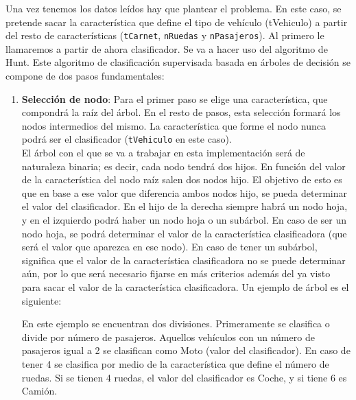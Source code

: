 \documentclass[12pt]{report}\usepackage[]{graphicx}\usepackage[dvipsnames]{xcolor}
\begin{document}
 			Una vez tenemos los datos leídos hay que plantear el problema. En este caso, se pretende sacar la característica que define el tipo de vehículo (tVehiculo) a partir del resto de características (\texttt{tCarnet}, \texttt{nRuedas} y \texttt{nPasajeros}). Al primero le llamaremos a partir de ahora clasificador. Se va a hacer uso del algoritmo de Hunt. Este algoritmo de clasificación supervisada basada en árboles de decisión se compone de dos pasos fundamentales:
 			
 			\begin{enumerate}
 				\item \textbf{Selección de nodo}: Para el primer paso se elige una característica, que compondrá la raíz del árbol. En el resto de pasos, esta selección formará los nodos intermedios del mismo. La característica que forme el nodo nunca podrá ser el clasificador (\texttt{tVehiculo} en este caso).\\
 				
 				El árbol con el que se va a trabajar en esta implementación será de naturaleza binaria; es decir, cada nodo tendrá dos hijos. En función del valor de la característica del nodo raíz salen dos nodos hijo. El objetivo de esto es que en base a ese valor que diferencia ambos nodos hijo, se pueda determinar el valor del clasificador. En el hijo de la derecha siempre habrá un nodo hoja, y en el izquierdo podrá haber un nodo hoja o un subárbol. En caso de ser un nodo hoja, se podrá determinar el valor de la característica clasificadora (que será el valor que aparezca en ese nodo). En caso de tener un subárbol, significa que el valor de la característica clasificadora no se puede determinar aún, por lo que será necesario fijarse en más criterios además del ya visto para sacar el valor de la característica clasificadora. Un ejemplo de árbol es el siguiente:
 				
 				\begin{center}

 				\end{center}
 				
 				En este ejemplo se encuentran dos divisiones. Primeramente se clasifica o divide por número de pasajeros. Aquellos vehículos con un número de pasajeros igual a 2 se clasifican como Moto (valor del clasificador). En caso de tener 4 se clasifica por medio de la característica que define el número de ruedas. Si se tienen 4 ruedas, el valor del clasificador es Coche, y si tiene 6 es Camión.\\
 				

\end{enumerate}
\end{document}
